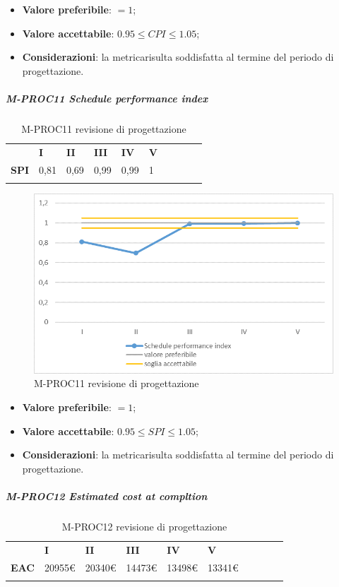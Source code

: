 \begin{itemize}
	\item \textbf{Valore preferibile}: $=1$;
	\item \textbf{Valore accettabile}: $0.95 \le CPI \le 1.05$;
	\item \textbf{Considerazioni}: la metrica\glosp risulta soddisfatta al termine del periodo di progettazione\glo.
\end{itemize}
\subparagraph{M-PROC11 Schedule performance index} \mbox{}
\begin{longtable}[H!] {						
		>{}p{50mm}  		
		>{}p{8mm}
		>{}p{8mm}		
		>{}p{8mm}		
		>{}p{8mm}		
		>{}p{8mm}		
		>{}p{8mm}
		>{}p{8mm}
		>{}p{8mm}
		>{}p{8mm}
	}
	\rowcolor{gray!50}
	\textbf{} & \textbf{I} & \textbf{II} & \textbf{III} & \textbf{IV} & \textbf{V} \TBstrut \\ [2mm]
	\textbf{SPI} & 0,81 & 0,69 & 0,99 & 0,99 & 1 \TBstrut \\ [2mm]
	\rowcolor{white}
	\caption{M-PROC11 revisione di progettazione\glo}
\end{longtable}
\begin{figure}[H] 	
	\includegraphics[width=\linewidth]{./img/grafici/RP8.png}	
	\caption{M-PROC11 revisione di progettazione\glo}	
\end{figure}
\begin{itemize}
	\item \textbf{Valore preferibile}: $=1$;
	\item \textbf{Valore accettabile}: $0.95 \le SPI \le 1.05$;
	\item \textbf{Considerazioni}: la metrica\glosp risulta soddisfatta al termine del periodo di progettazione\glo.
\end{itemize}
\subparagraph{M-PROC12 Estimated cost at compltion} \mbox{}
\begin{longtable}[H!] {						
		>{}p{38mm}  		
		>{}p{12mm}
		>{}p{12mm}		
		>{}p{12mm}		
		>{}p{12mm}		
		>{}p{12mm}		
		>{}p{12mm}
		>{}p{12mm}
		>{}p{12mm}
		>{}p{12mm}
	}
	\rowcolor{gray!50}
	\textbf{} & \textbf{I} & \textbf{II} & \textbf{III} & \textbf{IV} & \textbf{V} \TBstrut \\ [2mm]
	\textbf{EAC} & 20955\euro & 20340\euro & 14473\euro & 13498\euro & 13341\euro \TBstrut \\ [2mm]
	\rowcolor{white}
	\caption{M-PROC12 revisione di progettazione\glo}
\end{longtable}
